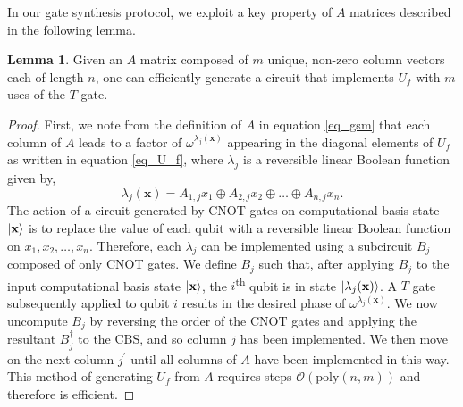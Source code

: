 \documentclass[notitlepage]{article}
\theoremstyle{definition}
\theoremstyle{problem}
\theoremstyle{lemma}
\newtheorem{lemma}{Lemma}[section]
\begin{document}
In our gate synthesis protocol, we exploit a key property of $A$ matrices described in the following lemma.
\begin{lemma}
	\label{l_gsm2circ}
	Given an $A$ matrix composed of $m$ unique, non-zero column vectors each of length $n$, one can efficiently generate a circuit that implements $U_f$ with $m$ uses of the $T$ gate.
\end{lemma}
\begin{proof}
	First, we note from the definition of $A$ in equation \ref{eq_gsm} that each column of $A$ leads to a factor of $\omega^{\lambda_j(\mathbf{x})}$ appearing in the diagonal elements of $U_f$ as written in equation \ref{eq_U_f}, where $\lambda_j$ is a reversible linear Boolean function given by,
	\begin{equation}
	\lambda_j(\mathbf{x}) = A_{1,j}x_1 \oplus A_{2,j}x_2 \oplus \dots \oplus A_{n,j}x_n.
	\end{equation}
	The action of a circuit generated by CNOT gates on computational basis state $\left\vert{\mathbf{x}}\right\rangle$ is to replace the value of each qubit with a reversible linear Boolean function on $x_1, x_2, \dots, x_n$. Therefore, each $\lambda_j$ can be implemented using a subcircuit $B_j$ composed of only CNOT gates. We define $B_j$ such that, after applying $B_j$ to the input computational basis state $\left\vert{\mathbf{x}}\right\rangle$, the $i$\textsuperscript{th} qubit is in state $\left\vert{\lambda_j(\mathbf{x})}\right\rangle$. A $T$ gate subsequently applied to qubit $i$ results in the desired phase of $\omega^{\lambda_j(\mathbf{x})}$. We now uncompute $B_j$ by reversing the order of the CNOT gates and applying the resultant $B_j^\dagger$ to the CBS, and so column $j$ has been implemented. We then move on the next column $j^\prime$ until all columns of $A$ have been implemented in this way. This method of generating $U_f$ from $A$ requires steps $\mathcal{O}(\textrm{poly}(n,m))$ and therefore is efficient.
\end{proof}

\end{document}
